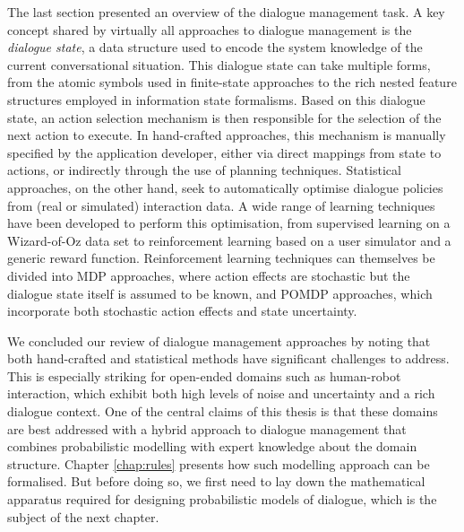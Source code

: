 The last section presented an overview of the dialogue management task. A key concept shared by virtually all approaches to dialogue management is the \textit{dialogue state}, a data structure used to encode the system knowledge of the current conversational situation.  This dialogue state can take multiple forms, from the atomic symbols used in finite-state approaches to the rich nested feature structures employed in information state formalisms. Based on this dialogue state, an action selection mechanism is then responsible for the selection of the next action to execute.  In hand-crafted approaches, this mechanism is manually specified by the application developer, either via direct mappings from state to actions, or indirectly through the use of planning techniques.  Statistical approaches, on the other hand, seek to automatically optimise dialogue policies from (real or simulated) interaction data.  A wide range of learning techniques have been developed to perform this optimisation, from supervised learning on a Wizard-of-Oz data set to reinforcement learning based on a user simulator and a generic reward function.   Reinforcement learning techniques can themselves be divided into MDP approaches, where action effects are stochastic but the dialogue state itself is assumed to be known, and POMDP approaches, which incorporate both stochastic action effects and state uncertainty.

We concluded our review of dialogue management approaches by noting that both hand-crafted and statistical methods have significant challenges to address.  This is especially striking for open-ended domains such as human-robot interaction, which exhibit both high levels of noise and uncertainty and a rich dialogue context.   One of the central claims of this thesis is that these domains are best addressed with a hybrid approach to dialogue management that combines probabilistic modelling with expert knowledge about the domain structure.  Chapter \ref{chap:rules} presents how such modelling approach can be formalised.  But before doing so, we first need to lay down the mathematical apparatus required for designing probabilistic models of dialogue, which is the subject of the next chapter.

